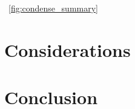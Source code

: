 \documentclass{article}
\begin{document}
\lipsum[1]~\ref{fig:condense_summary}


\section{Considerations}
\lipsum[1]
\label{considerations}
\section{Conclusion}
\lipsum[1]
\label{conclusion}



\newpage


% 
% 
% 
% 
\end{document}
